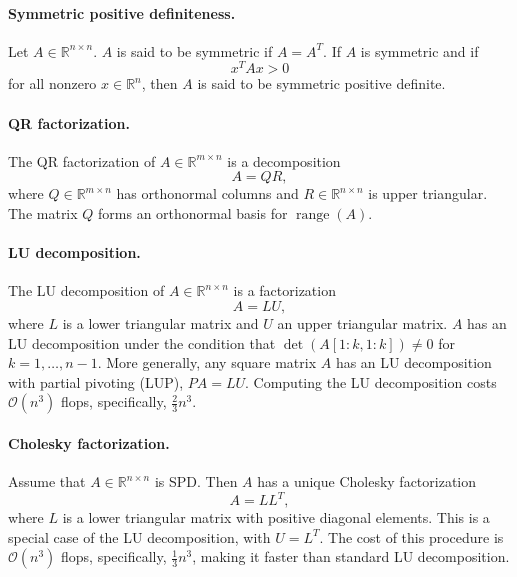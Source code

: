 \paragraph{Symmetric positive definiteness.}
Let $A \in \mathbb{R}^{n \times n}$. $A$ is said to be symmetric if $A = A^T$. If $A$ is symmetric and if 
\begin{equation*}
    x^T A x > 0
\end{equation*}
for all nonzero $x \in \mathbb{R}^n$, then $A$ is said to be symmetric positive definite.


\paragraph{QR factorization.}
The QR factorization of $A\in\mathbb R^{m\times n}$ is a decomposition
\begin{equation*}
    A = QR,
\end{equation*}
where $Q\in\mathbb R^{m\times n}$ has orthonormal columns and $R\in\mathbb R^{n\times n}$ is upper triangular. The matrix $Q$ forms an orthonormal basis for $\operatorname{range}(A)$.


\paragraph{LU decomposition.} The LU decomposition of $A \in \mathbb{R}^{n \times n}$ is a factorization
\begin{equation*}
    A = L U,
\end{equation*}
where $L$ is a lower triangular matrix and $U$ an upper triangular matrix. $A$ has an LU decomposition under the condition that $\operatorname{det}(A[1:k, 1:k]) \neq 0$ for $k=1,\dots, n-1$. More generally, any square matrix $A$ has an LU decomposition with partial pivoting (LUP), $PA = LU$. Computing the LU decomposition costs $\mathcal{O}(n^3)$ flops, specifically, $\tfrac{2}{3}n^3$.


\paragraph{Cholesky factorization.} Assume that $A\in\mathbb R^{n\times n}$ is SPD. Then $A$ has a unique Cholesky factorization
\begin{equation*}
    A = L L^T,
\end{equation*}
where $L$ is a lower triangular matrix with positive diagonal elements. This is a special case of the LU decomposition, with $U = L^T$. The cost of this procedure is $\mathcal{O}(n^3)$ flops, specifically, $\tfrac{1}{3}n^3$, making it faster than standard LU decomposition.


